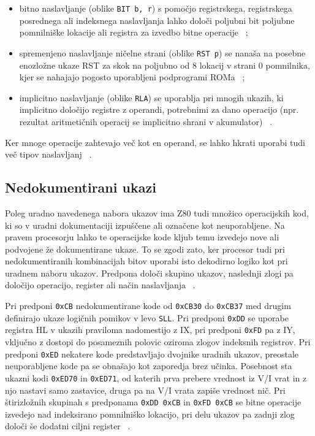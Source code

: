 \documentclass[a4paper, 12pt, openright]{book}
\begin{document}
\begin{itemize}
        \item bitno naslavljanje (oblike \texttt{BIT b, r}) s pomočjo
            registrskega, registrskega posrednega ali indeksnega naslavljanja lahko
            določi poljubni bit poljubne pomnilniške lokacije ali registra za izvedbo
            bitne operacije ~\cite{z80cpuusermanual};

        \item spremenjeno naslavljanje ničelne strani (oblike \texttt{RST p}) se
            nanaša na posebne enozložne ukaze RST za skok na poljubno od 8
            lokacij v strani 0 pomnilnika, kjer se nahajajo pogosto uporabljeni podprogrami
            ROMa ~\cite{z80cpuusermanual};

        \item implicitno naslavljanje (oblike \texttt{RLA}) se uporablja pri
            mnogih ukazih, ki implicitno določijo registre z operandi,
            potrebnimi za dano operacijo (npr. rezultat aritmetičnih operacij se
            implicitno shrani v akumulator) ~\cite{z80cpuusermanual}.
    \end{itemize}

    Ker mnoge operacije zahtevajo več kot en operand, se lahko hkrati uporabi
    tudi več tipov naslavljanj ~\cite{z80cpuusermanual}.

    \subsection{Nedokumentirani ukazi}

    Poleg uradno navedenega nabora ukazov ima Z80 tudi množico operacijskih kod, ki
    so v uradni dokumentaciji izpuščene ali označene kot neuporabljene. Na
    pravem procesorju lahko te operacijske kode kljub temu izvedejo nove ali
    podvojene že dokumentirane ukaze. To se zgodi zato, ker procesor tudi pri
    nedokumentiranih kombinacijah bitov uporabi isto dekodirno logiko kot pri
    uradnem naboru ukazov. Predpona določi skupino ukazov, naslednji zlogi pa
    določijo operacijo, register ali način naslavljanja ~\cite{theundocumentedz80documented}.

    Pri predponi \texttt{0xCB} nedokumentirane kode od \texttt{0xCB30} do
    \texttt{0xCB37} med drugim definirajo ukaze logičnih pomikov v levo \texttt{SLL}.
    Pri predponi \texttt{0xDD} se uporabe registra HL v ukazih praviloma
    nadomestijo z IX, pri predponi \texttt{0xFD} pa z IY, vključno z dostopi do posameznih
    polovic oziroma zlogov indeksnih registrov. Pri predponi \texttt{0xED} nekatere
    kode predstavljajo dvojnike uradnih ukazov, preostale neuporabljene kode pa
    se obnašajo kot zaporedja brez učinka. Posebnost sta ukazni kodi \texttt{0xED70}
    in \texttt{0xED71}, od katerih prva prebere vrednost iz V/I vrat in z njo
    nastavi samo zastavice, druga pa na V/I vrata zapiše vrednost nič. Pri
    štirizložnih skupinah s predponama \texttt{0xDD 0xCB} in \texttt{0xFD 0xCB}
    se bitne operacije izvedejo nad indeksirano pomnilniško lokacijo, pri delu ukazov
    pa zadnji zlog določi še dodatni ciljni register ~\cite{theundocumentedz80documented}.
\end{document}
